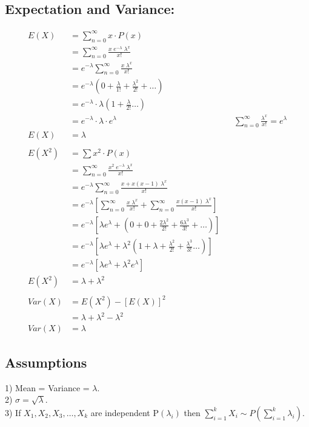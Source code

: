 \documentclass[
10pt, %
a4paper, %
]{report}
\begin{document}
\subsection*{Expectation and Variance:}
\begin{align*}
    E(X) &= \sum_{n=0}^\infty x \cdot P(x) \\
         &= \sum_{n=0}^\infty \frac{x\;e^{-\lambda}\;\lambda^x}{x!} \\
         &= e^{-\lambda} \sum_{n=0}^\infty \frac{x\; \lambda^x}{x!} \\
         &= e^{-\lambda} \left(0+\frac{\lambda}{1!}+\frac{\lambda^2}{2!}+ \dots \right) \\
         &= e^{-\lambda} \cdot \lambda \left(1+ \frac{\lambda}{2!} \dots\right) \\
         &= e^{-\lambda} \cdot \lambda \cdot e^{\lambda} && \sum_{n=0}^\infty \frac{\lambda^x}{x!} = e^{\lambda} \\
    E(X) &= \lambda \\ \\
    E(X^2) &= \sum x^2 \cdot P(x) \\
           &= \sum_{n=0}^\infty \frac{x^2\;e^{-\lambda}\;\lambda^x}{x!} \\
           &= e^{-\lambda} \sum_{n=0}^\infty \frac{x+x(x-1)\; \lambda^x}{x!} \\
           &= e^{-\lambda} \left[ \sum_{n=0}^\infty \frac{x\; \lambda^x}{x!} + \sum_{n=0}^\infty \frac{x(x-1)\; \lambda^x}{x!}\right] \\
           &= e^{-\lambda} \left[\lambda e^{\lambda}+ \left(0+0+\frac{2\lambda^2}{2!}+\frac{6\lambda^3}{3!}+ \dots \right)\right] \\
           &= e^{-\lambda} \left[\lambda e^{\lambda}+ \lambda^2\left(1+\lambda+ \frac{\lambda^2}{2!} + \frac{\lambda^3}{3!}\dots \right)\right] \\
           &= e^{-\lambda} \left[\lambda e^{\lambda}+ \lambda^2 e^{\lambda}\right] \\
    E(X^2) &= \lambda+\lambda^2 \\ \\
    Var(X) &= E(X^2) - [E(X)]^2 \\
           &= \lambda+\lambda^2-\lambda^2 \\
    Var(X) &= \lambda
\end{align*}

\subsection*{Assumptions}
1) Mean = Variance = \(\lambda\). \\
2) \(\sigma=\sqrt{\lambda}\). \\
3) If \(X_1, X_2, X_3, \dots, X_k\) are independent P\((\lambda_i)\) then \(\sum_{i=1}^k X_i \sim P(\sum_{i=1}^k \lambda_i)\).
\end{document}

